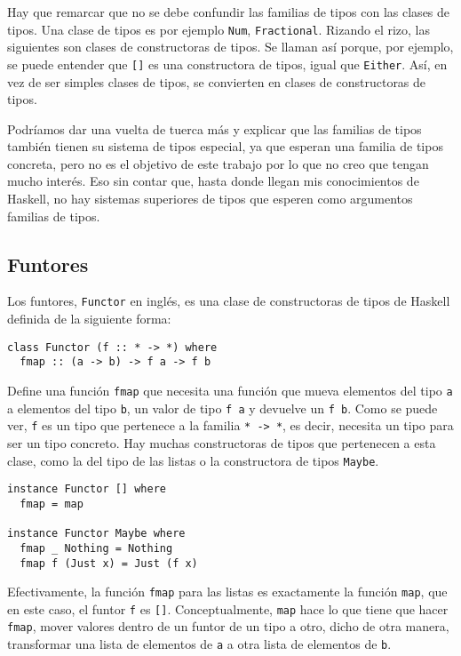\documentclass[class=article, crop=false]{standalone}
\begin{document}
Hay que remarcar que no se debe confundir las familias de tipos con las clases de tipos. Una
clase de tipos es por ejemplo \verb`Num`, \verb`Fractional`. Rizando el rizo, las siguientes
son clases de constructoras de tipos. Se llaman así porque, por ejemplo, se puede entender
que \verb`[]` es una constructora de tipos, igual que \verb`Either`. Así, en vez de ser
simples clases de tipos, se convierten en clases de constructoras de tipos.

Podríamos dar una vuelta de tuerca más y explicar que las familias de tipos también tienen
su sistema de tipos especial, ya que esperan una familia de tipos concreta, pero no es el
objetivo de este trabajo por lo que no creo que tengan mucho interés. Eso sin contar que,
hasta donde llegan mis conocimientos de Haskell, no hay sistemas superiores de tipos que
esperen como argumentos familias de tipos.

\subsection{Funtores}
Los funtores, \verb`Functor` en inglés, es una clase de constructoras de tipos de Haskell
definida de la siguiente forma:

\begin{verbatim}
class Functor (f :: * -> *) where
  fmap :: (a -> b) -> f a -> f b
\end{verbatim}

Define una función \verb`fmap` que necesita una función que mueva elementos del tipo \verb`a`
a elementos del tipo \verb`b`, un valor de tipo \verb`f a` y devuelve un \verb`f b`. Como se
puede ver, \verb`f` es un tipo que pertenece a la familia \verb`* -> *`, es decir, necesita
un tipo para ser un tipo concreto. Hay muchas constructoras de tipos que pertenecen a esta
clase, como la del tipo de las listas o la constructora de tipos \verb`Maybe`.

\begin{verbatim}
instance Functor [] where
  fmap = map

instance Functor Maybe where
  fmap _ Nothing = Nothing
  fmap f (Just x) = Just (f x)
\end{verbatim}

Efectivamente, la función \verb`fmap` para las listas es exactamente la función \verb`map`,
que en este caso, el funtor \verb`f` es \verb`[]`. Conceptualmente, \verb`map` hace lo que
tiene que hacer \verb`fmap`, mover valores dentro de un funtor de un tipo a otro, dicho de
otra manera, transformar una lista de elementos de \verb`a` a otra lista de elementos de
\verb`b`.
\end{document}
